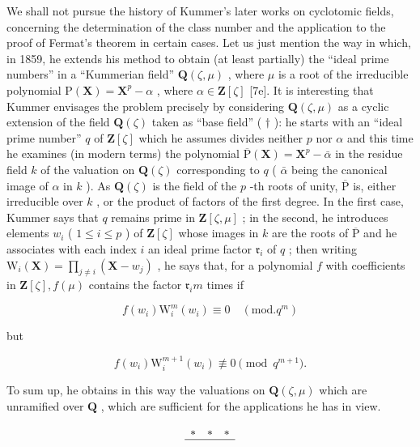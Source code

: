 We shall not pursue the history of Kummer's later works on cyclotomic fields, concerning the determination of the class number and the application to the proof of Fermat's theorem in certain cases. Let us just mention the way in which, in 1859, he extends his method to obtain (at least partially) the ``ideal prime numbers'' in a ``Kummerian field'' \(\mathbf{Q}(\zeta, \mu)\) , where \(\mu\) is a root of the irreducible polynomial \(\mathrm{P}(\mathbf{X}) = \mathbf{X}^p - \alpha\) , where \(\alpha \in \mathbf{Z}[\zeta]\) {[}7e{]}. It is interesting that Kummer envisages the problem precisely by considering \(\mathbf{Q}(\zeta, \mu)\) as a cyclic extension of the field \(\mathbf{Q}(\zeta)\) taken as ``base field'' ( \(\dagger\) ): he starts with an ``ideal prime number'' \(q\) of \(\mathbf{Z}[\zeta]\) which he assumes divides neither \(p\) nor \(\alpha\) and this time he examines (in modern terms) the polynomial \(\overline{\mathrm{P}}(\mathbf{X}) = \mathbf{X}^p - \bar{\alpha}\) in the residue field \(k\) of the valuation on \(\mathbf{Q}(\zeta)\) corresponding to \(q\) ( \(\bar{\alpha}\) being the canonical image of \(\alpha\) in \(k\) ). As \(\mathbf{Q}(\zeta)\) is the field of the \(p\) -th roots of unity, \(\overline{\mathrm{P}}\) is, either irreducible over \(k\) , or the product of factors of the first degree. In the first case, Kummer says that \(q\) remains prime in \(\mathbf{Z}[\zeta, \mu]\) ; in the second, he introduces elements \(w_i\) ( \(1 \leqslant i \leqslant p\) ) of \(\mathbf{Z}[\zeta]\) whose images in \(k\) are the roots of \(\overline{\mathrm{P}}\) and he associates with each index \(i\) an ideal prime factor \(\mathfrak{r}_i\) of \(q\) ; then writing \(\mathrm{W}_i(\mathbf{X}) = \prod_{j \neq i} (\mathbf{X} - w_j)\) , he says that, for a polynomial \(f\) with coefficients in \(\mathbf{Z}[\zeta], f(\mu)\) contains the factor \(\mathfrak{r}_i m\) times if

\[
f (w _ {i}) \mathrm{W} _ {i} ^ {m} (w _ {i}) \equiv 0 \quad (\mathrm{mod.} q ^ {m})
\]

but

\[
f (w _ {i}) \mathrm{W} _ {i} ^ {m + 1} (w _ {i}) \not \equiv 0 \pmod {q ^ {m + 1}}.
\]

To sum up, he obtains in this way the valuations on \(\mathbf{Q}(\zeta, \mu)\) which are unramified over \(\mathbf{Q}\) , which are sufficient for the applications he has in view.

\[
\begin{array}{c c c} \ast & \ast & \ast \\ \hline \end{array}
\]

